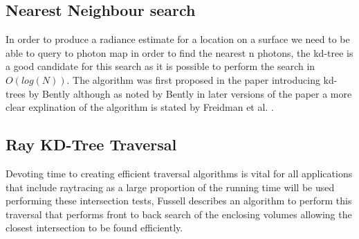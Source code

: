 \subsection{Nearest Neighbour search}
In order to produce a radiance estimate for a location on a surface we need to be able to query to
photon map in order to find the nearest n photons, the kd-tree is a good candidate for this search
as it is possible to perform the search in $O(log(N))$. The algorithm was first proposed in the
paper introducing kd-trees by Bently \cite{Bently75} although as noted by Bently in later versions of
the paper a more clear explination of the algorithm is stated by Freidman et al. \cite{Freidman77}.

\subsection{Ray KD-Tree Traversal}
Devoting time to creating efficient traversal algorithms is vital for all applications that
include raytracing as a large proportion of the running time will be used performing these
intersection tests, Fussell \cite{Fussell88} describes an algorithm to perform this traversal that
performs front to back search of the enclosing volumes allowing the closest intersection to be found
efficiently.
